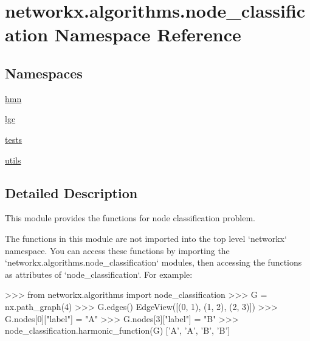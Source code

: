 \hypertarget{namespacenetworkx_1_1algorithms_1_1node__classification}{}\section{networkx.\+algorithms.\+node\+\_\+classification Namespace Reference}
\label{namespacenetworkx_1_1algorithms_1_1node__classification}
\subsection*{Namespaces}
\begin{DoxyCompactItemize}
\item 
 \hyperlink{namespacenetworkx_1_1algorithms_1_1node__classification_1_1hmn}{hmn}
\item 
 \hyperlink{namespacenetworkx_1_1algorithms_1_1node__classification_1_1lgc}{lgc}
\item 
 \hyperlink{namespacenetworkx_1_1algorithms_1_1node__classification_1_1tests}{tests}
\item 
 \hyperlink{namespacenetworkx_1_1algorithms_1_1node__classification_1_1utils}{utils}
\end{DoxyCompactItemize}


\subsection{Detailed Description}
\begin{DoxyVerb}This module provides the functions for node classification problem.

The functions in this module are not imported
into the top level `networkx` namespace.
You can access these functions by importing
the `networkx.algorithms.node_classification` modules,
then accessing the functions as attributes of `node_classification`.
For example:

  >>> from networkx.algorithms import node_classification
  >>> G = nx.path_graph(4)
  >>> G.edges()
  EdgeView([(0, 1), (1, 2), (2, 3)])
  >>> G.nodes[0]["label"] = "A"
  >>> G.nodes[3]["label"] = "B"
  >>> node_classification.harmonic_function(G)
  ['A', 'A', 'B', 'B']\end{DoxyVerb}
 